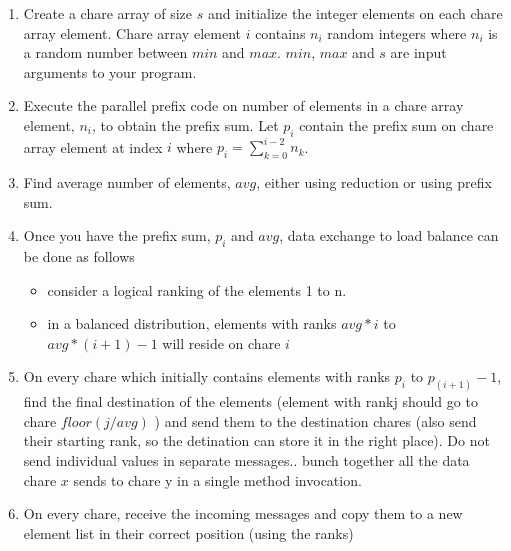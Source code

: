 \documentclass{article}
\begin{document}
\begin{enumerate}

\item Create a chare array of size $s$ and initialize the integer elements on
each chare array element. Chare array element $i$ contains $n_i$ random integers
where $n_i$ is a random number between $min$ and $max$. $min$,
$max$ and $s$ are input arguments to your program.

\item Execute the parallel prefix code on number of elements in a chare array
element, $n_i$, to obtain the prefix sum. Let $p_i$ contain the prefix sum on
chare array element at index $i$ where $p_i = \sum\limits_{k=0}^{i-2} n_k$.

\item Find average number of elements, $avg$, either using reduction or using prefix sum.

\item Once you have the prefix sum, $p_i$ and $avg$, data exchange to load
balance can be done as follows
\begin{itemize}
\item consider a logical ranking of the elements 1 to n.
\item in a balanced distribution, elements with ranks $avg*i$ to $avg*(i +1)-1$ will reside on chare $i$
\end{itemize}


\item On every chare which initially contains elements with ranks $p_i$ to $p_(i+1) - 1$, find the final destination of the elements (element with rankj should go to chare $floor(j/avg)$ ) and send them to the destination chares (also send their starting rank, so the detination can store it in the right place). Do not send individual values in separate messages.. bunch together all the data chare $x$ sends to chare y in a single method invocation.

\item On every chare, receive the incoming messages and copy them to a new element list in their correct position (using the ranks)
 
\end{enumerate}
\end{document}
